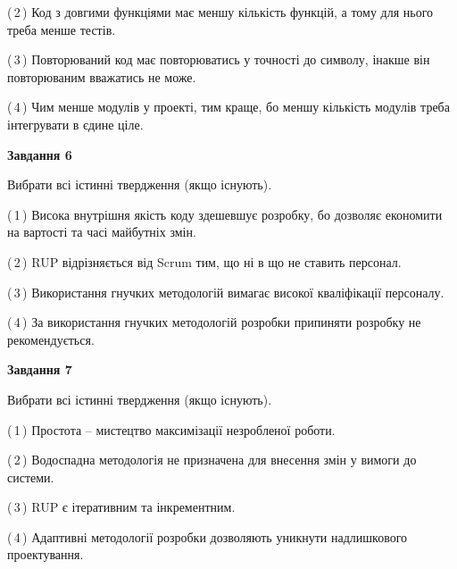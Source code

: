 \documentclass[10pt, ukrainian]{article}
\begin{document}
{\begin {large}
(\,2\,) Код з довгими функціями має меншу кількість функцій, а тому для нього треба менше тестів. %



(\,3\,) Повторюваний код має повторюватись у точності до символу, інакше він повторюваним вважатись не може. %



(\,4\,) Чим менше модулів у проекті, тим краще, бо меншу кількість модулів треба інтегрувати в єдине ціле. %

\newpage

{\begin {center}\textbf{Завдання 6}\end {center}}\par
Вибрати всі істинні твердження (якщо існують).\par
\vspace{2mm}



(\,1\,) Висока внутрішня якість коду здешевшує розробку, бо дозволяє економити на вартості та часі майбутніх змін. %



(\,2\,) RUP відрізняється від Scrum тим, що ні в що не ставить персонал.%



(\,3\,) Використання гнучких методологій вимагає високої кваліфікації персоналу. %



(\,4\,) За використання гнучких методологій розробки припиняти розробку не рекомендується. %


{\begin {center}\textbf{Завдання 7}\end {center}}\par
Вибрати всі істинні твердження (якщо існують).\par
\vspace{2mm}



(\,1\,) Простота – мистецтво максимізації незробленої роботи. %



(\,2\,) Водоспадна методологія не призначена для внесення змін у вимоги до системи. %



(\,3\,) RUP є ітеративним та інкрементним.%



(\,4\,) Адаптивні методології розробки дозволяють уникнути надлишкового проектування. %



\end{large}}
\end{document}
